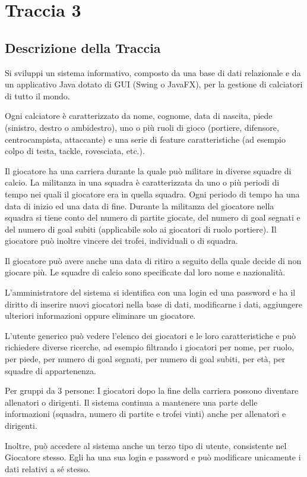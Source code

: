 \section{Traccia 3}

\subsection{\Large Descrizione della Traccia}
\bigskip

Si sviluppi un sistema informativo, composto da una base
di dati relazionale e da un applicativo Java dotato
di GUI (Swing o JavaFX), per la gestione
di calciatori di tutto il mondo.

Ogni calciatore è caratterizzato da nome, cognome,
data di nascita, piede (sinistro, destro o ambidestro),
uno o più ruoli di gioco (portiere, difensore,
centrocampista, attaccante) e una serie
di feature caratteristiche (ad esempio colpo di testa,
tackle, rovesciata, etc.).

Il giocatore ha una carriera durante
la quale può militare in diverse squadre di calcio.
La militanza in una squadra è caratterizzata
da uno o più periodi di tempo nei quali
il giocatore era in quella squadra.
Ogni periodo di tempo ha una data di inizio
ed una data di fine.
Durante la militanza del giocatore nella squadra
si tiene conto del numero di partite giocate,
del numero di goal segnati e del numero
di goal subiti (applicabile solo ai giocatori
di ruolo portiere). Il giocatore può inoltre vincere
dei trofei, individuali o di squadra.

Il giocatore può avere anche una data di ritiro
a seguito della quale decide di non giocare più.
Le squadre di calcio sono specificate
dal loro nome e nazionalità.

L’amministratore del sistema si identifica con una login
ed una password e ha il diritto di inserire
nuovi giocatori nella base di dati, modificarne i dati,
aggiungere ulteriori informazioni
oppure eliminare un giocatore.

L’utente generico può vedere l’elenco dei giocatori e
le loro caratteristiche e può richiedere diverse ricerche,
ad esempio filtrando i giocatori per nome, per ruolo,
per piede, per numero di goal segnati,
per numero di goal subiti, per età,
per squadre di appartenenza.

Per gruppi da 3 persone: I giocatori dopo la fine
della carriera possono diventare allenatori o dirigenti.
Il sistema continua a mantenere una parte
delle informazioni (squadra, numero di partite
e trofei vinti) anche per allenatori e dirigenti.

Inoltre, può accedere al sistema anche un terzo tipo
di utente, consistente nel Giocatore stesso.
Egli ha una sua login e password e può modificare
unicamente i dati relativi a sé stesso.
